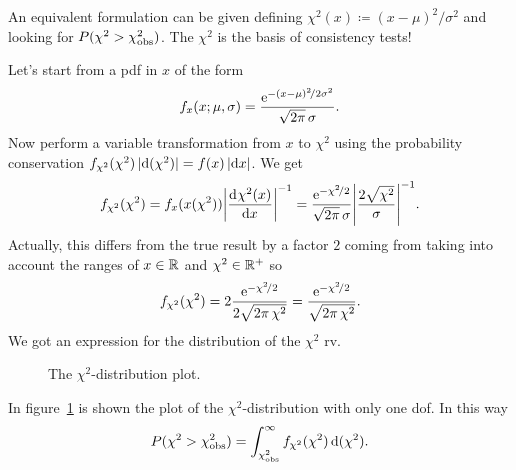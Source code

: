An equivalent formulation can be given defining $\chi^2(x)\coloneqq (x-\mu)^2\!/\sigma^2$ and looking for $P(\chi^2 > \chi^2_\textup{obs})$.
The $\chi^2$ is the basis of consistency tests!


Let's start from a \ac{pdf} in $x$ of the form
\begin{equation}
	f_x(x;\mu,\sigma) = \frac{\mathrm{e}^{-(x-\mu)^2\!/2\sigma^2} }{\sqrt{2\pi}\,\sigma}.
\end{equation}
Now perform a variable transformation from $x$ to $\chi^2$ using the probability conservation $f_{\chi^2}(\chi^2)\,\lvert\mathop{}\!\mathrm{d}(\chi^2)\rvert = f(x) \,\lvert\mathop{}\!\mathrm{d} x\rvert$.
We get
\begin{equation}
	f_{\chi^2}(\chi^2) %
	= f_x(x(\chi^2)) \abs*{\deriv{\chi^2(x)}{x}}^{-1}
	= \frac{\eu^{-\chi^2\!/2} }{\sqrt{2\pi}\,\sigma} \abs*{\frac{2\sqrt{\chi^2}}{\sigma}}^{-1}.
\end{equation}
Actually, this differs from the true result by a factor $2$ coming from taking into account the ranges of $x\in\mathbb{R}$ and $\chi^2 \in\mathbb{R}^+$ so
\begin{equation}
	f_{\chi^2}(\chi^2) = 2 \frac{\mathrm{e}^{-\chi^2\!/2} }{2\sqrt{2\pi\,\chi^2}} = \frac{\mathrm{e}^{-\chi^2\!/2} }{\sqrt{2\pi\,\chi^2}}.
\end{equation}
We got an expression for the distribution of the $\chi^2$ \ac{rv}.
\begin{figure}
	\centering
	\caption{The $\chi^2$-distribution plot.}
	\label{fig:chi2distro}
\end{figure}
In figure~\ref{fig:chi2distro} is shown the plot of the $\chi^2$-distribution with only one \ac{dof}.
In this way
\begin{equation}
	P(\chi^2 > \chi^2_\textup{obs})
	= 
	\int_{\chi^2_\textup{obs}}^\infty f_{\chi^2}(\chi^2)\mathop{}\!\mathrm{d} (\chi^2).
\end{equation}


